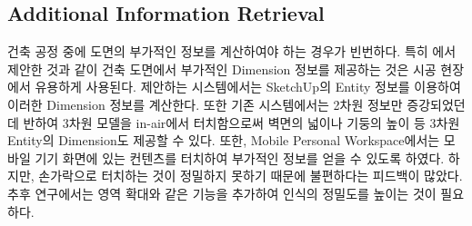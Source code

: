 




\subsection{Additional Information Retrieval}

건축 공정 중에 도면의 부가적인 정보를 계산하여야 하는 경우가 빈번하다. 특히 \cite{song_penlight:_2009}에서 제안한 것과 같이 건축 도면에서 부가적인 Dimension 정보를 제공하는 것은 시공 현장에서 유용하게 사용된다. 제안하는 시스템에서는 SketchUp의 Entity 정보를 이용하여 이러한 Dimension 정보를 계산한다. 또한 기존 시스템에서는 2차원 정보만 증강되었던데 반하여 3차원 모델을 in-air에서 터치함으로써 벽면의 넓이나 기둥의 높이 등 3차원 Entity의 Dimension도 제공할 수 있다. 또한, Mobile Personal Workspace에서는 모바일 기기 화면에 있는 컨텐츠를 터치하여 부가적인 정보를 얻을 수 있도록 하였다. 하지만, 손가락으로 터치하는 것이 정밀하지 못하기 때문에 불편하다는 피드백이 많았다. 추후 연구에서는 영역 확대와 같은 기능을 추가하여 인식의 정밀도를 높이는 것이 필요하다.



